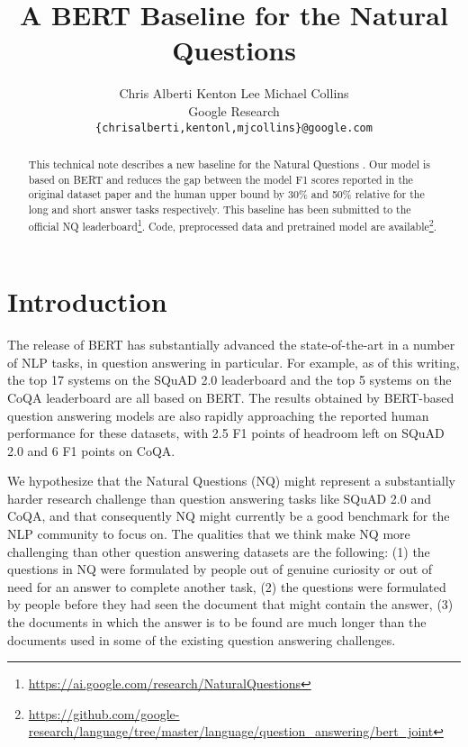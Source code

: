 \documentclass[11pt,a4paper]{article}
\title{A BERT Baseline for the Natural Questions}
\author{
  Chris Alberti\footnotemark[1] \;\;\;\; Kenton Lee \;\;\;\; Michael Collins\footnotemark[1] \\
  Google Research \\
  \small{\tt \{chrisalberti,kentonl,mjcollins\}@google.com}
}
\date{}
\begin{document}
\maketitle
\begin{abstract}
  This technical note describes a new baseline for the Natural Questions \cite{kwiatkowski2019nq}. Our model is based on BERT \cite{devlin2018bert} and reduces the gap between the model F1 scores reported in the original dataset paper and the human upper bound by 30\% and 50\% relative for the long and short answer tasks respectively. This baseline has been submitted to the official NQ leaderboard\footnote[2]{
  \url{https://ai.google.com/research/NaturalQuestions}
  }. Code, preprocessed data and pretrained model are available\footnote[3]{
  \url{https://github.com/google-research/language/tree/master/language/question_answering/bert_joint}}.
\end{abstract}


\section{Introduction}

The release of BERT \cite{devlin2018bert} has substantially advanced the state-of-the-art in a number of NLP tasks, in question answering in particular. For example, as of this writing, the top 17 systems on the SQuAD 2.0 leaderboard \cite{rajpurkar2018know} and the top 5 systems on the CoQA leaderboard \cite{reddy2018coqa} are all based on BERT. The results obtained by BERT-based question answering models are also rapidly approaching the reported human performance for these datasets, with 2.5 F1 points of headroom left on SQuAD 2.0 and 6 F1 points on CoQA.

We hypothesize that the Natural Questions (NQ) \cite{kwiatkowski2019nq} might represent a substantially harder research challenge than question answering tasks like SQuAD 2.0 and CoQA, and that consequently NQ might currently be a good benchmark for the NLP community to focus on. The qualities that we think make NQ more challenging than other question answering datasets are the following: (1) the questions in NQ were formulated by people out of genuine curiosity or out of need for an answer to complete another task, (2) the questions were formulated by people before they had seen the document that might contain the answer, (3) the documents in which the answer is to be found are much longer than the documents used in some of the existing question answering challenges.
\end{document}
